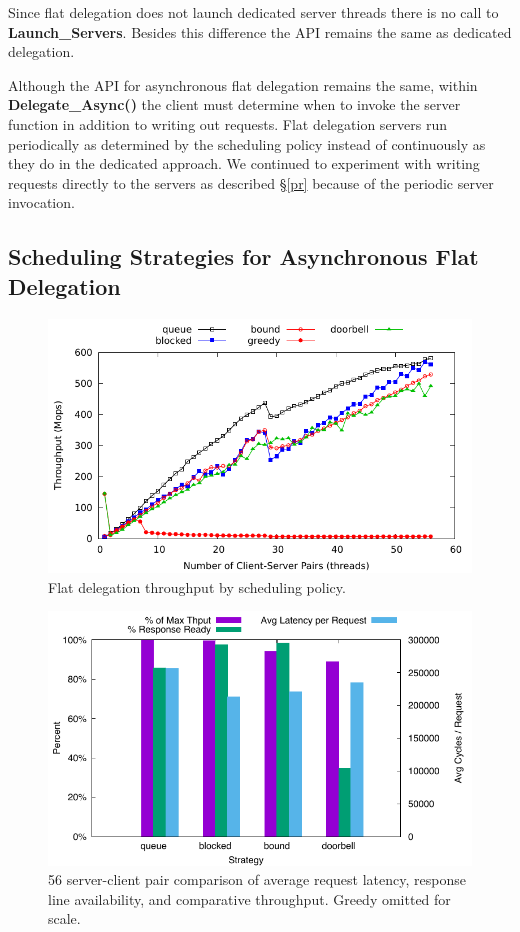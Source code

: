 \documentclass{uicthesi}
\begin{document}
Since flat delegation does not launch dedicated server threads there is no call to \textbf{Launch\_Servers}. Besides this difference the API remains the same as dedicated delegation. 

Although the API for asynchronous flat delegation remains the same, within \textbf{Delegate\_Async()} the client must determine when to invoke the server function in addition to writing out requests. Flat delegation servers run periodically as determined by the scheduling policy instead of continuously as they do in the dedicated approach. We continued to experiment with writing requests directly to the servers as described \S\ref{pr} because of the periodic server invocation.

\subsection{Scheduling Strategies for Asynchronous Flat Delegation}  

\begin{figure}[ht!]
\centering
\includegraphics[width=0.9\columnwidth]{FIG/flat_delegation_strategy.pdf}
\caption{Flat delegation throughput by scheduling policy.}
\label{fig:flat_delegation_strategy}
\end{figure}

\begin{figure}[ht!]
\centering
\includegraphics[width=0.9\columnwidth]{FIG/flat_latency_56.pdf}
\caption{56 server-client pair comparison of average request latency, response line availability, and comparative throughput. Greedy omitted for scale.}
\label{fig:flat_latency_56}
\end{figure}
\end{document}
